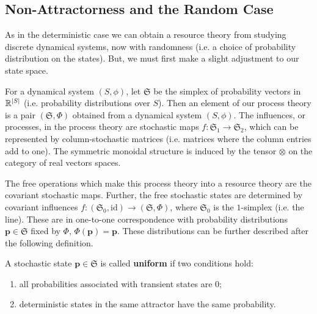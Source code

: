 \subsection{Non-Attractorness and the Random Case}

As in the deterministic case we can obtain a resource theory from studying discrete dynamical systems, now with randomness (i.e. a choice of probability distribution on the states). But, we must first make a slight adjustment to our state space.

For a dynamical system $(S,\phi)$, let $\mathfrak{S}$ be the simplex of probability vectors in $\mathbb R^{|S|}$ (i.e. probability distributions over $S$). Then an element of our process theory is a pair $(\mathfrak{S},\Phi)$ obtained from a dynamical system $(S,\phi)$. The influences, or processes, in the process theory are stochastic maps $f:\mathfrak{S}_1\rightarrow \mathfrak{S}_2$, which can be represented by column-stochastic matrices (i.e. matrices where the column entries add to one). The symmetric monoidal structure is induced by the tensor $\otimes$ on the category of real vectors spaces. 

The free operations which make this process theory into a resource theory are the covariant stochastic maps. Further, the free stochastic states are determined by covariant influences $f:(\mathfrak{S}_0,\text{id})\rightarrow (\mathfrak{S},\Phi)$, where $\mathfrak{S}_0$ is the $1$-simplex (i.e. the line). These are in one-to-one correspondence with probability distributions $\mathbf{p} \in \mathfrak{S}$ fixed by $\Phi$, $\Phi(\mathbf{p}) = \mathbf{p}$. These distributions can be further described after the following definition.


\begin{defn}[label=defn:uniform]
    A stochastic state $\mathbf{p} \in \mathfrak{S}$ is called \textbf{uniform} if two conditions hold:
    \begin{enumerate}
        \item all probabilities associated with transient states are $0$;
        \item deterministic states in the same attractor have the same probability.
    \end{enumerate}
\end{defn}


